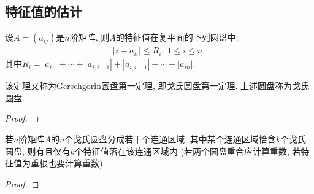 \documentclass[../../main.tex]{subfiles}%
\begin{document}
\subsection{特征值的估计}

\begin{theorem}[第一圆盘定理]\label{theorem:第一圆盘定理}
设\(A = (a_{ij})\)是\(n\)阶矩阵, 则\(A\)的特征值在复平面的下列圆盘中:
\begin{align*}
|z - a_{ii}| \leqslant  R_{i},\ 1 \leqslant  i \leqslant  n,
\end{align*}
其中\(R_{i} = |a_{i1}| + \cdots + |a_{i,i - 1}| + |a_{i,i + 1}| + \cdots + |a_{in}|\).
\end{theorem}
\begin{remark}
该定理又称为Gerschgorin圆盘第一定理, 即戈氏圆盘第一定理. 上述圆盘称为戈氏圆盘.
\end{remark}
\begin{proof}

\end{proof}

\begin{theorem}[第二圆盘定理]\label{theorem:第二圆盘定理}
若\(n\)阶矩阵\(A\)的\(n\)个戈氏圆盘分成若干个连通区域, 其中某个连通区域恰含\(k\)个戈氏圆盘, 则有且仅有\(k\)个特征值落在该连通区域内 (若两个圆盘重合应计算重数, 若特征值为重根也要计算重数).
\end{theorem}
\begin{proof}

\end{proof}
\end{document}
